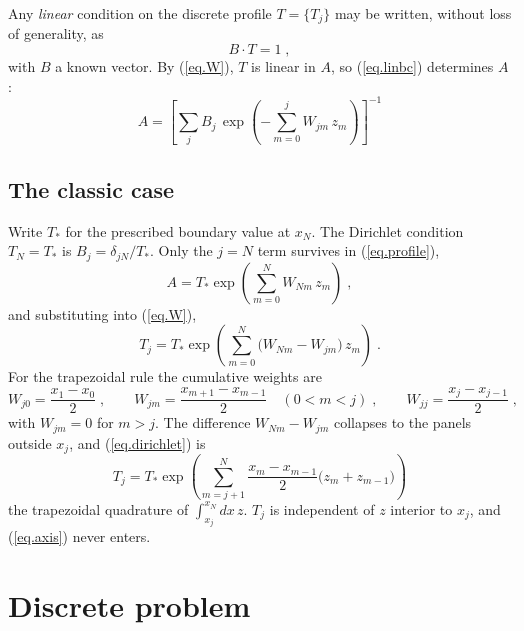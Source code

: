 \documentclass[12pt]{article}
\begin{document}
Any {\it linear} condition on the discrete profile $T = \{ T_j \}$ may
be written, without loss of generality, as
%
\begin{equation}
B \cdot T = 1 \; ,
\label{eq.linbc}
\end{equation}
%
with $B$ a known vector.  By (\ref{eq.W}), $T$ is linear in $A$, so
(\ref{eq.linbc}) determines $A$:
%
\begin{equation}
\boxed{\;
A = \left[ \sum_{j} B_j \, \exp \left(
 - \sum_{m=0}^{j} W_{jm} \, z_m \right) \right]^{-1} \; }
\label{eq.profile}
\end{equation}

\subsection{The classic case}

Write $T_*$ for the prescribed boundary value at $x_N$.  The Dirichlet
condition $T_N = T_*$ is $B_j = \delta_{jN}/T_*$.  Only the $j=N$ term
survives in (\ref{eq.profile}),
%
\begin{equation}
A = T_* \exp \left( \sum_{m=0}^{N} W_{Nm} \, z_m \right) \; ,
\end{equation}
%
and substituting into (\ref{eq.W}),
%
\begin{equation}
T_j = T_* \exp \left( \sum_{m=0}^{N}
 \bigl( W_{Nm} - W_{jm} \bigr) \, z_m \right) \; .
\label{eq.dirichlet}
\end{equation}
%
For the trapezoidal rule the cumulative weights are
%
\begin{equation}
W_{j0} = \frac{x_1-x_0}{2} \; , \qquad
W_{jm} = \frac{x_{m+1}-x_{m-1}}{2} \quad (0 < m < j) \; , \qquad
W_{jj} = \frac{x_j-x_{j-1}}{2} \; ,
\label{eq.trap}
\end{equation}
%
with $W_{jm} = 0$ for $m > j$.  The difference $W_{Nm} - W_{jm}$
collapses to the panels outside $x_j$, and (\ref{eq.dirichlet}) is
%
\begin{equation}
\boxed{\;
T_j = T_* \exp \left( \sum_{m=j+1}^{N}
 \frac{x_m - x_{m-1}}{2} \bigl( z_m + z_{m-1} \bigr) \right) \; }
\label{eq.dirichlettrap}
\end{equation}
%
the trapezoidal quadrature of $\int_{x_j}^{x_N} dx \, z$.  $T_j$ is
independent of $z$ interior to $x_j$, and (\ref{eq.axis}) never enters.

\section{Discrete problem}
\end{document}
